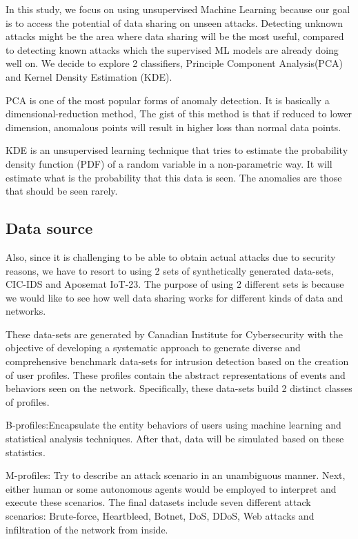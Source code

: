 \begin{background}
In this study, we focus on using unsupervised Machine Learning because our goal is to access the potential of data sharing on unseen attacks. Detecting unknown attacks might be the area where data sharing will be the most useful, compared to detecting known attacks which the supervised ML models are already doing well on. We decide to explore 2 classifiers, Principle Component Analysis(PCA) and Kernel Density Estimation (KDE). 

PCA is one of the most popular forms of anomaly detection. It is basically a dimensional-reduction method, The gist of this method is that if reduced to lower dimension, anomalous points will result in higher loss than normal data points.

KDE is an unsupervised learning technique that tries to estimate the probability density function (PDF) of a random variable in a non-parametric way. It will estimate what is the probability that this data is seen. The anomalies are those that should be seen rarely.







\subsection{Data source}
Also, since it is challenging to be able to obtain actual attacks due to security reasons, we have to resort to using 2 sets of synthetically generated data-sets, CIC-IDS and Aposemat IoT-23. The purpose of using 2 different sets is because we would like to see how well data sharing works for different kinds of data and networks.  

These data-sets are generated by Canadian Institute for Cybersecurity with the objective of developing a systematic approach to generate diverse and comprehensive benchmark data-sets for intrusion detection based on the creation of user profiles. These profiles contain the abstract representations of events and behaviors seen on the network. Specifically, these data-sets build 2 distinct classes of profiles. 

B-profiles:Encapsulate the entity behaviors of users using machine learning and statistical analysis  techniques. After that, data will be simulated based on these statistics.

M-profiles: Try to describe an attack scenario in an unambiguous manner. Next, either human or some autonomous agents would be employed to interpret and execute these scenarios. The final datasets include seven different attack scenarios: Brute-force, Heartbleed, Botnet, DoS, DDoS, Web attacks and infiltration of the network from inside. 


\end{background}
